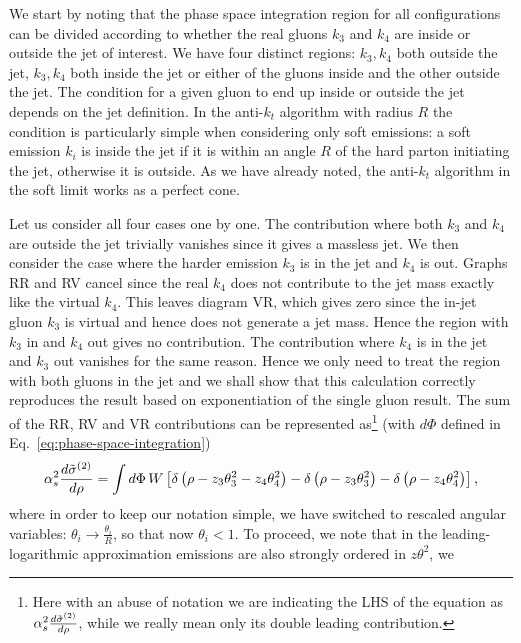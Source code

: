 We start by noting that the phase space integration region for all configurations can be divided according to whether the real gluons $k_3$ and $k_4$ are inside or outside the jet of interest. We have four distinct regions: $k_3,k_4$ both outside the jet, $k_3,k_4$ both inside the jet or either of the gluons inside and the other outside the jet. The condition for a given gluon to end up inside or outside the jet depends on the jet definition. 
In the anti-$k_t$ algorithm with radius $R$ the condition is
particularly simple when considering only soft emissions: a soft
emission $k_i$ is inside the jet if it is within an angle $R$ of the
hard parton initiating the jet, otherwise it is outside. As we have already noted, the anti-$k_t$ algorithm in the soft limit works as a perfect cone.

Let us consider all four cases one by one.
%
The contribution where both $k_3$ and $k_4$ are outside the jet
trivially vanishes since it gives a massless jet.
%
We then consider the case where the harder emission $k_3$ is in the
jet and $k_4$ is out. Graphs RR and RV cancel since the real $k_4$ does not contribute to the jet mass exactly like the virtual $k_4$. This leaves diagram VR, which gives zero since the in-jet gluon $k_3$ is virtual and hence does not generate a jet mass.
%
Hence the region with $k_3$ in and $k_4$ out gives no contribution. 
%
The contribution where $k_4$ is in the jet and $k_3$ out vanishes for the same reason.
%
Hence we only need to treat the region with both gluons in the jet and
we shall show that this calculation correctly reproduces the result
based on exponentiation of the single gluon result. The sum of the RR,
RV and VR contributions can be represented as\footnote{Here with an
  abuse of notation we are indicating the LHS of the equation as
  $\alpha_s^2 \frac{d \tilde \sigma^{(2)}}{{d}\rho}$, while we really mean
  only its double leading contribution.} (with $d\Phi$ defined in Eq.~\eqref{eq:phase-space-integration})
\begin{equation}
\alpha_s^2 \frac{d \tilde \sigma^{(2)}}{{d}\rho} = \int d \Phi\, W \left[ \delta\left(\rho- z_3 \theta_3^2-z_4 \theta_4^2\right)-\delta\left(\rho-z_3 \theta_3^2\right)-\delta \left(\rho-z_4 \theta_4^2 \right) \right],
\end{equation}
%
where in order to keep our notation simple, we have switched to rescaled angular variables: $\theta_i  \to \frac{\theta_i}{R}$, so that now $\theta_i<1$.
%
To proceed, we note that in the leading-logarithmic approximation
emissions are also strongly ordered in $z\theta^2$, \ie we
